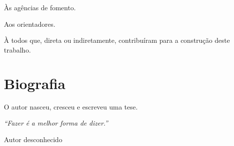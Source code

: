 \documentclass[tese]{UFRuralRJ}
\begin{document}
Às agências de fomento.

Aos orientadores.

À todos que, direta ou indiretamente, contribuíram para a construção deste 
trabalho.


\chapter*{Biografia}
O autor nasceu, cresceu e escreveu uma tese.


\clearpage\mbox{}\vfill\hspace{80mm}\begin{minipage}{76mm}\begin{flushright}{\em
``Fazer é a melhor forma de dizer.''
\par
Autor desconhecido
}\end{flushright}\end{minipage}


\generalabstracttrue
\begin{abstract}
Este é o resumo em português de minha tese. Claramente, este é o melhor resumo
que já foi escrito em um documento acadêmico produzido na UFRuralRJ.
\end{abstract}
\end{document}
